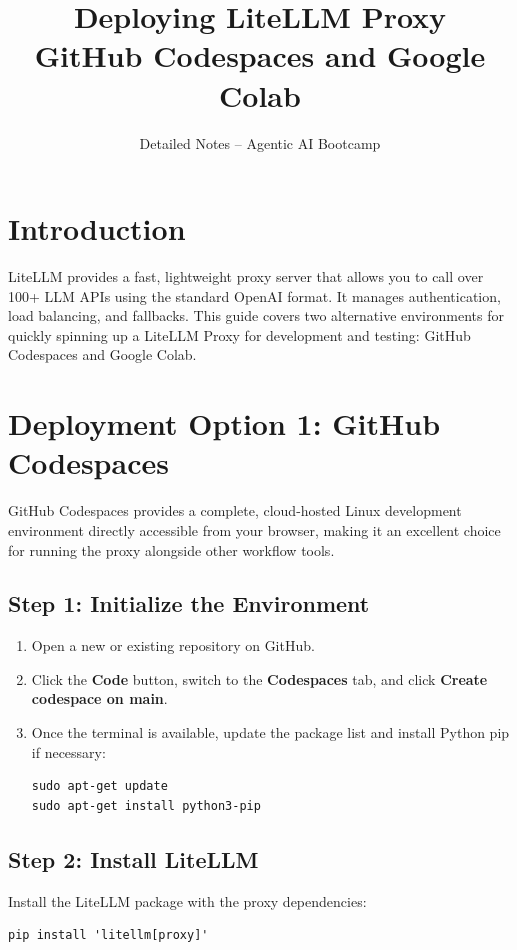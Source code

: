 \documentclass[12pt,a4paper]{article}
\title{\textbf{Deploying LiteLLM Proxy}\\\large GitHub Codespaces and Google Colab}
\author{Detailed Notes -- Agentic AI Bootcamp}\date{}
\begin{document}
\maketitle\tableofcontents\newpage

\section{Introduction}
LiteLLM provides a fast, lightweight proxy server that allows you to call over 100+ LLM APIs using the standard OpenAI format. It manages authentication, load balancing, and fallbacks. This guide covers two alternative environments for quickly spinning up a LiteLLM Proxy for development and testing: GitHub Codespaces and Google Colab.

\section{Deployment Option 1: GitHub Codespaces}
GitHub Codespaces provides a complete, cloud-hosted Linux development environment directly accessible from your browser, making it an excellent choice for running the proxy alongside other workflow tools.

\subsection{Step 1: Initialize the Environment}
\begin{enumerate}
    \item Open a new or existing repository on GitHub.
    \item Click the \textbf{Code} button, switch to the \textbf{Codespaces} tab, and click \textbf{Create codespace on main}.
    \item Once the terminal is available, update the package list and install Python pip if necessary:
    \begin{verbatim}
sudo apt-get update
sudo apt-get install python3-pip
    \end{verbatim}
\end{enumerate}

\subsection{Step 2: Install LiteLLM}
Install the LiteLLM package with the proxy dependencies:
\begin{verbatim}
pip install 'litellm[proxy]'
\end{verbatim}
\end{document}
